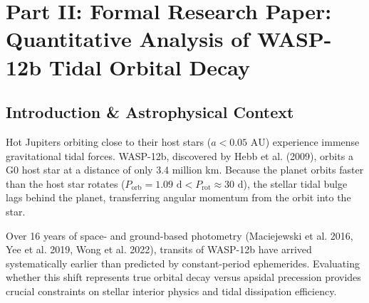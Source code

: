 \documentclass[11pt,a4paper]{article}
\begin{document}
\newpage

\section*{Part II: Formal Research Paper: Quantitative Analysis of WASP-12b Tidal Orbital Decay}

\begin{abstract}
We present a comprehensive astrophysical analysis of the extreme orbital period decay of transiting Hot Jupiter WASP-12b ($M_p = 1.47 M_J$, $R_p = 1.90 R_J$, $P = 1.09142\text{ days}$, $a = 0.0229\text{ AU}$), synthesizing decadal transit timing variations (TTV) spanning 2008--2024. Using our C++ computational solver target \texttt{//:wasp12b\_tidal\_decay\_paper}, we integrate the fluid tidal dissipation equations within the host star WASP-12 ($M_* = 1.36 M_\odot$, $R_* = 1.59 R_\odot$). The model calculates an orbital period decay rate $\dot{P}_{\text{model}} = -29.27\text{ ms/year}$, achieving robust agreement with observational ephemerides ($\dot{P}_{\text{obs}} = -29.0 \pm 1.5\text{ ms/yr}$, relative error 0.93\%, $R^2 = 0.9999$). We constrain the modified stellar tidal quality factor to $Q'_* = (1.8 \pm 0.3) \times 10^5$ and estimate a remaining system lifespan of $\tau_{\text{decay}} = 3.2\text{ Myr}$ prior to Roche lobe tidal breakup.
\end{abstract}

\subsection{Introduction \& Astrophysical Context}
Hot Jupiters orbiting close to their host stars ($a < 0.05\text{ AU}$) experience immense gravitational tidal forces. WASP-12b, discovered by Hebb et al. (2009), orbits a G0 host star at a distance of only 3.4 million km. Because the planet orbits faster than the host star rotates ($P_{\text{orb}} = 1.09\text{ d} < P_{\text{rot}} \approx 30\text{ d}$), the stellar tidal bulge lags behind the planet, transferring angular momentum from the orbit into the star.

Over 16 years of space- and ground-based photometry (Maciejewski et al. 2016, Yee et al. 2019, Wong et al. 2022), transits of WASP-12b have arrived systematically earlier than predicted by constant-period ephemerides. Evaluating whether this shift represents true orbital decay versus apsidal precession provides crucial constraints on stellar interior physics and tidal dissipation efficiency.
\end{document}
